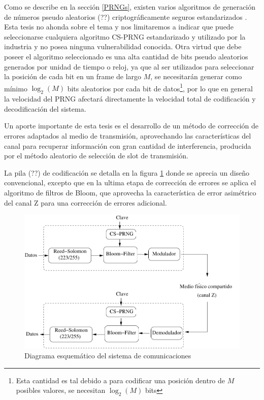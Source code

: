 Como se describe en la sección \ref{PRNGs}, existen varios algoritmos de generación de números pseudo aleatorios (??) criptográficamente seguros estandarizados \cite{gallagherfips}. Esta tesis no ahonda sobre el tema y nos limitaremos a indicar que puede seleccionarse cualquiera algoritmo CS-PRNG estandarizado y utilizado por la industria y no posea ninguna vulnerabilidad conocida. Otra virtud que debe poseer el algoritmo seleccionado es una alta cantidad de bits pseudo aleatorios generados por unidad de tiempo o reloj, ya que al ser utilizados para seleccionar la posición de cada bit en un frame de largo $M$, se necesitarán generar como mínimo $\log_2(M)$ bits aleatorios por cada bit de datos\footnote{Esta cantidad es tal debido a para codificar una posición dentro de $M$ posibles valores, se necesitan $\log_2(M)$ bits}, por lo que en general la velocidad del PRNG afectará directamente la velocidad total de codificación y decodificación del sistema.

Un aporte importante de esta tesis es el desarrollo de un método de corrección de errores adaptados al medio de transmisión, aprovechando las características del canal para recuperar información con gran cantidad de interferencia, producida por el método aleatorio de selección de slot de transmisión.

La pila (??) de codificación se detalla en la figura \ref{fig_comstack} donde se aprecia un diseño convencional, excepto que en la ultima etapa de corrección de errores se aplica el algoritmo de filtros de Bloom, que aprovecha la característica de error asimétrico del canal Z para una corrección de errores adicional.

\begin{figure}[t]
\centering
\includegraphics[width=4.5in]{graphs/Soft-stack3}
\caption{Diagrama esquemático del sistema de comunicaciones}
\label{fig_comstack}
\end{figure}

